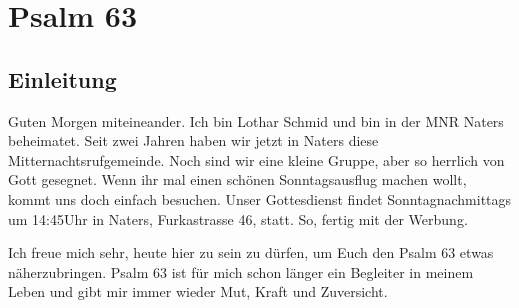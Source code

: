 \documentclass[14pt]{../../inc/mybib}
\author{Lothar Schmid}
\begin{document}
\setlength{\baselineskip}{1.5\baselineskip}

\section*{Psalm 63}
    \subsection*{Einleitung}
    Guten Morgen miteineander. Ich bin Lothar Schmid und bin in der MNR Naters beheimatet. Seit zwei Jahren haben wir jetzt in Naters diese Mitternachtsrufgemeinde. Noch sind wir eine kleine Gruppe, aber so herrlich von Gott gesegnet. Wenn ihr mal einen schönen Sonntagsausflug machen wollt, kommt uns doch einfach besuchen. Unser Gottesdienst findet Sonntagnachmittags um 14:45Uhr in Naters, Furkastrasse 46, statt. So, fertig mit der Werbung.
    
    Ich freue mich sehr, heute hier zu sein zu dürfen, um Euch den Psalm 63 etwas näherzubringen. Psalm 63 ist für mich schon länger ein Begleiter in meinem Leben und gibt mir immer wieder Mut, Kraft und Zuversicht. 
\end{document}
